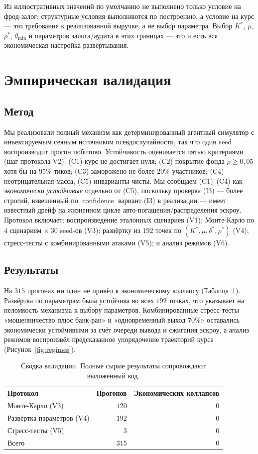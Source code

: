 \documentclass[11pt]{article}
\theoremstyle{plain}
\theoremstyle{definition}
\theoremstyle{remark}
\newcommand{\confidence}{\operatorname{confidence}}
\begin{document}
Из иллюстративных значений по умолчанию не выполнено только условие на фрод-залог; структурные условия выполняются по построению, а условие на курс --- это требование к реализованной выручке, а не выбор параметра. Выбор $K^*$, $\mu$, $\rho^*$, $\theta_{\min}$ и параметров залога/аудита в этих границах --- это и есть вся экономическая настройка развёртывания.

\section{Эмпирическая валидация}\label{sec:empirical}

\subsection{Метод}

Мы реализовали полный механизм как детерминированный агентный симулятор с инъектируемым сеяным источником псевдослучайности, так что один seed воспроизводит прогон побитово. Устойчивость оценивается пятью критериями (шаг протокола V2): (C1) курс не достигает нуля; (C2) покрытие фонда $\rho \ge 0{,}05$ хотя бы на $95\%$ тиков; (C3) заморожено не более $20\%$ участников; (C4) неотрицательная масса; (C5) инварианты чисты. Мы сообщаем (C1)--(C4) как \emph{экономически устойчивые} отдельно от (C5), поскольку проверка (I3) --- более строгий, взвешенный по $\confidence$ вариант (I3) в реализации --- имеет известный дрейф на жизненном цикле авто-погашения/распределения эскроу. Протокол включает: воспроизведение эталонных сценариев (V1); Монте-Карло по $4$ сценариям $\times\ 30$ seed-ов (V3); развёртку из $192$ точек по $(K^*,\mu,\delta^*,\rho^*)$ (V4); стресс-тесты с комбинированными атаками (V5); и анализ режимов (V6).

\subsection{Результаты}

На $315$ прогонах ни один не привёл к экономическому коллапсу (Таблица~\ref{tab:results}). Развёртка по параметрам была устойчива во всех $192$ точках, что указывает на неломкость механизма к выбору параметров. Комбинированные стресс-тесты «мошенничество плюс банк-ран» и «одновременный выход $70\%$» оставались экономически устойчивыми за счёт очереди вывода и сжигания эскроу, а анализ режимов воспроизвёл предсказанное упорядочение траекторий курса (Рисунок~\ref{fig:regimes}).

\begin{table}[h]
\centering
\begin{tabular}{lrr}
\toprule
Протокол & Прогонов & Экономических коллапсов\\
\midrule
Монте-Карло (V3) & $120$ & $0$\\
Развёртка параметров (V4) & $192$ & $0$\\
Стресс-тесты (V5) & $3$ & $0$\\
\midrule
Всего & $315$ & $0$\\
\bottomrule
\end{tabular}
\caption{Сводка валидации. Полные сырые результаты сопровождают выложенный код.}
\label{tab:results}
\end{table}
\end{document}
